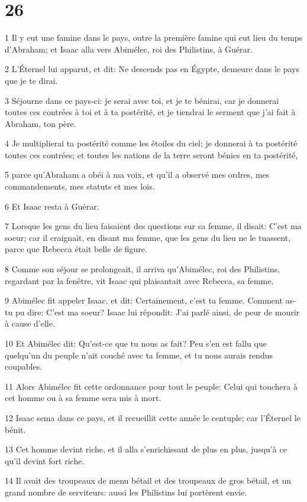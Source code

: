 \chapter{26}

\par 1 Il y eut une famine dans le pays, outre la première famine qui eut lieu du temps d'Abraham; et Isaac alla vers Abimélec, roi des Philistins, à Guérar.
\par 2 L'Éternel lui apparut, et dit: Ne descends pas en Égypte, demeure dans le pays que je te dirai.
\par 3 Séjourne dans ce pays-ci: je serai avec toi, et je te bénirai, car je donnerai toutes ces contrées à toi et à ta postérité, et je tiendrai le serment que j'ai fait à Abraham, ton père.
\par 4 Je multiplierai ta postérité comme les étoiles du ciel; je donnerai à ta postérité toutes ces contrées; et toutes les nations de la terre seront bénies en ta postérité,
\par 5 parce qu'Abraham a obéi à ma voix, et qu'il a observé mes ordres, mes commandements, mes statuts et mes lois.
\par 6 Et Isaac resta à Guérar.
\par 7 Lorsque les gens du lieu faisaient des questions sur sa femme, il disait: C'est ma soeur; car il craignait, en disant ma femme, que les gens du lieu ne le tuassent, parce que Rebecca était belle de figure.
\par 8 Comme son séjour se prolongeait, il arriva qu'Abimélec, roi des Philistins, regardant par la fenêtre, vit Isaac qui plaisantait avec Rebecca, sa femme.
\par 9 Abimélec fit appeler Isaac, et dit: Certainement, c'est ta femme. Comment as-tu pu dire: C'est ma soeur? Isaac lui répondit: J'ai parlé ainsi, de peur de mourir à cause d'elle.
\par 10 Et Abimélec dit: Qu'est-ce que tu nous as fait? Peu s'en est fallu que quelqu'un du peuple n'ait couché avec ta femme, et tu nous aurais rendus coupables.
\par 11 Alors Abimélec fit cette ordonnance pour tout le peuple: Celui qui touchera à cet homme ou à sa femme sera mis à mort.
\par 12 Isaac sema dans ce pays, et il recueillit cette année le centuple; car l'Éternel le bénit.
\par 13 Cet homme devint riche, et il alla s'enrichissant de plus en plus, jusqu'à ce qu'il devint fort riche.
\par 14 Il avait des troupeaux de menu bétail et des troupeaux de gros bétail, et un grand nombre de serviteurs: aussi les Philistins lui portèrent envie.
